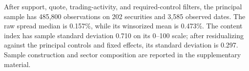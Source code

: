 After support, quote, trading-activity, and required-control filters, the principal sample has 485,800 observations on 202 securities and 3,585 observed dates. The raw spread median is 0.157\%, while its winsorized mean is 0.473\%. The content index has sample standard deviation 0.710 on its 0--100 scale; after residualizing against the principal controls and fixed effects, its standard deviation is 0.297. Sample construction and sector composition are reported in the supplementary material.
